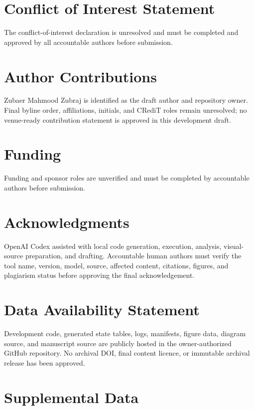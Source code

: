 \documentclass[utf8]{FrontiersinHarvard}
\begin{document}
\section*{Conflict of Interest Statement}

The conflict-of-interest declaration is unresolved and must be completed and approved by all accountable authors before submission.

\section*{Author Contributions}

Zubaer Mahmood Zubraj is identified as the draft author and repository owner. Final byline order, affiliations, initials, and CRediT roles remain unresolved; no venue-ready contribution statement is approved in this development draft.

\section*{Funding}

Funding and sponsor roles are unverified and must be completed by accountable authors before submission.

\section*{Acknowledgments}

OpenAI Codex assisted with local code generation, execution, analysis, visual-source preparation, and drafting. Accountable human authors must verify the tool name, version, model, source, affected content, citations, figures, and plagiarism status before approving the final acknowledgement.

\section*{Data Availability Statement}

Development code, generated state tables, logs, manifests, figure data, diagram source, and manuscript source are publicly hosted in the owner-authorized GitHub repository. No archival DOI, final content licence, or immutable archival release has been approved.

\section*{Supplemental Data}
\end{document}
